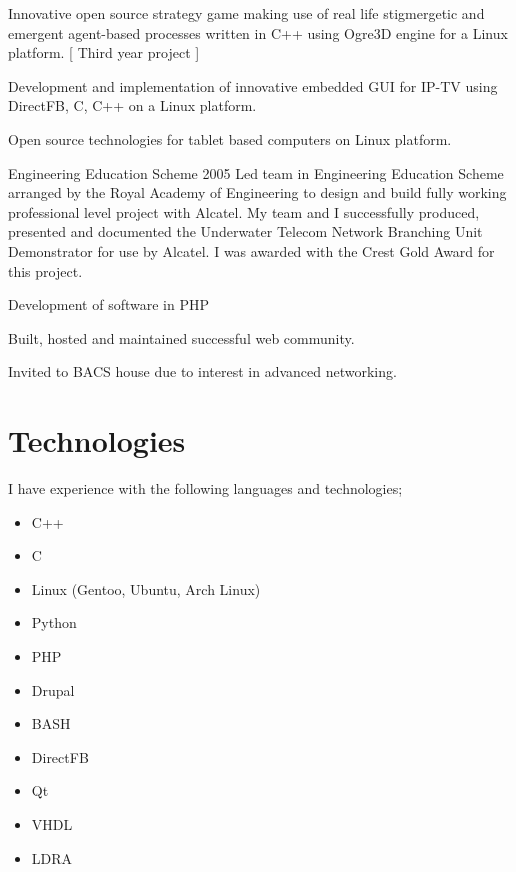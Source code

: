 \documentclass[overlapped,line,letterpaper]{res}
\begin{document}
\begin{resume}
{
    Innovative open source strategy game making use of real life stigmergetic 
    and emergent agent-based processes written in C++ using Ogre3D engine for a 
    Linux platform. [ Third year project ]
}

{ 
    Development and implementation of innovative embedded GUI for IP-TV using 
    DirectFB, C, C++ on a Linux platform.
}

{ 
    Open source technologies for tablet based computers on Linux platform. 
}

  {Engineering Education Scheme}
  {2005}
{
    Led team in Engineering Education Scheme arranged by the Royal Academy of
    Engineering to design and build fully working professional level project 
    with Alcatel.
    My team and I successfully produced, presented and documented the Underwater
    Telecom Network Branching Unit Demonstrator for use by Alcatel. 
    I was awarded with the Crest Gold Award for this project.
}

{ 
    Development of software in PHP 
} 

{ 
    Built, hosted and maintained successful web community. 
}

{
        Invited to BACS house due to interest in advanced networking.
}

\section{\bf{Technologies} }
I have experience with the following languages and technologies;
\begin{itemize}
 \item C++
 \item C
 \item Linux (Gentoo, Ubuntu, Arch Linux)
 \item Python 
 \item PHP
 \item Drupal
 \item BASH
 \item DirectFB
 \item Qt
 \item VHDL
 \item LDRA
\end{itemize}


\end{resume}
\end{document}
